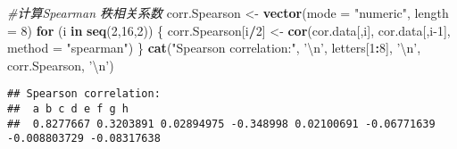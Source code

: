 \documentclass[
]{article}
\newenvironment{Shaded}{\begin{snugshade}}{\end{snugshade}}
\newcommand{\CharTok}[1]{\textcolor[rgb]{0.31,0.60,0.02}{#1}}
\newcommand{\CommentTok}[1]{\textcolor[rgb]{0.56,0.35,0.01}{\textit{#1}}}
\newcommand{\ControlFlowTok}[1]{\textcolor[rgb]{0.13,0.29,0.53}{\textbf{#1}}}
\newcommand{\DataTypeTok}[1]{\textcolor[rgb]{0.13,0.29,0.53}{#1}}
\newcommand{\DecValTok}[1]{\textcolor[rgb]{0.00,0.00,0.81}{#1}}
\newcommand{\KeywordTok}[1]{\textcolor[rgb]{0.13,0.29,0.53}{\textbf{#1}}}
\newcommand{\NormalTok}[1]{#1}
\newcommand{\OperatorTok}[1]{\textcolor[rgb]{0.81,0.36,0.00}{\textbf{#1}}}
\newcommand{\StringTok}[1]{\textcolor[rgb]{0.31,0.60,0.02}{#1}}
\begin{document}
\begin{Shaded}
\begin{Highlighting}[]
\CommentTok{#计算Spearman 秩相关系数}
\NormalTok{corr.Spearson <-}\StringTok{ }\KeywordTok{vector}\NormalTok{(}\DataTypeTok{mode =} \StringTok{"numeric"}\NormalTok{, }\DataTypeTok{length =} \DecValTok{8}\NormalTok{)}
\ControlFlowTok{for}\NormalTok{ (i }\ControlFlowTok{in} \KeywordTok{seq}\NormalTok{(}\DecValTok{2}\NormalTok{,}\DecValTok{16}\NormalTok{,}\DecValTok{2}\NormalTok{)) \{}
\NormalTok{  corr.Spearson[i}\OperatorTok{/}\DecValTok{2}\NormalTok{] <-}\StringTok{ }\KeywordTok{cor}\NormalTok{(cor.data[,i], cor.data[,i}\DecValTok{-1}\NormalTok{], }\DataTypeTok{method =} \StringTok{"spearman"}\NormalTok{)}
\NormalTok{\}}
\KeywordTok{cat}\NormalTok{(}\StringTok{"Spearson correlation:"}\NormalTok{, }\StringTok{'}\CharTok{\textbackslash{}n}\StringTok{'}\NormalTok{, letters[}\DecValTok{1}\OperatorTok{:}\DecValTok{8}\NormalTok{], }\StringTok{'}\CharTok{\textbackslash{}n}\StringTok{'}\NormalTok{, corr.Spearson, }\StringTok{'}\CharTok{\textbackslash{}n}\StringTok{'}\NormalTok{)}
\end{Highlighting}
\end{Shaded}

\begin{verbatim}
## Spearson correlation: 
##  a b c d e f g h 
##  0.8277667 0.3203891 0.02894975 -0.348998 0.02100691 -0.06771639 -0.008803729 -0.08317638
\end{verbatim}
\end{document}

